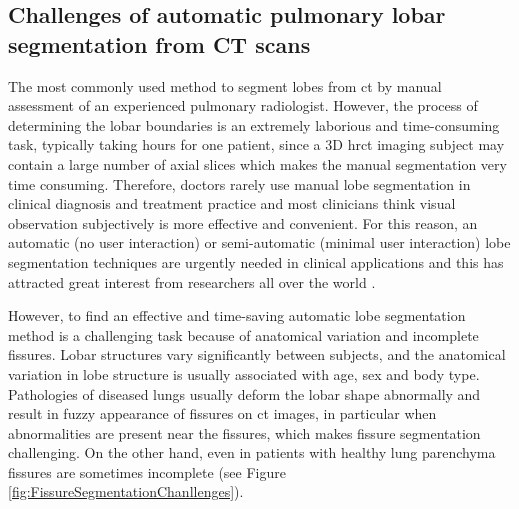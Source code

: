 \subsection{Challenges of automatic pulmonary lobar segmentation from CT scans} \label{SegmentationChallenge}
The most commonly used method to segment lobes from \gls{ct} by manual assessment of an experienced pulmonary radiologist. However, the process of determining the lobar boundaries is an extremely laborious and time-consuming task, typically taking hours for one patient, since a 3D \gls{hrct} imaging subject may contain a large number of axial slices which makes the manual segmentation very time consuming. Therefore, doctors rarely use manual lobe segmentation in clinical diagnosis and treatment practice and most clinicians think visual observation subjectively is more effective and convenient. For this reason, an automatic (no user interaction) or semi-automatic (minimal user interaction) lobe segmentation techniques are urgently needed in clinical applications and this has attracted great interest from researchers all over the world \citep{van2013automated,pu2009computational,ukil2009anatomy}.

However, to find an effective and time-saving automatic lobe segmentation method is a challenging task because of anatomical variation and incomplete fissures. Lobar structures vary significantly between subjects, and the anatomical variation in lobe structure is usually associated with age, sex and body type. Pathologies of diseased lungs usually deform the lobar shape abnormally and result in fuzzy appearance of fissures on \gls{ct} images, in particular when abnormalities are present near the fissures, which makes fissure segmentation challenging. On the other hand, even in patients with healthy lung parenchyma fissures are sometimes incomplete \citep{gulsun2006variability, doel2015review} (see Figure \ref{fig:FissureSegmentationChanllenges}).


